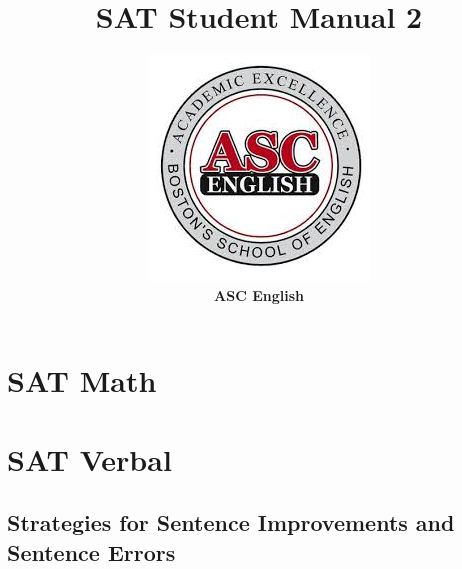 \documentclass[12pt]{book}
\title{\textbf{\sffamily\huge SAT Student Manual 2}}
\author{\includegraphics{logo}\\\textbf{\sffamily\large ASC English}}
\date{}
\begin{document}
\frontmatter
\maketitle


{\sffamily\tableofcontents}
\mainmatter



\part{SAT Math}



	
	
	
	
	
	
	


	
	
	
	
	


	
	
	
	
	
	


	
	
	
	


	
	
	
	


	
	


	
	
	
	

\part{SAT Verbal}

\chapter{Strategies for Sentence Improvements and Sentence Errors}
	
	
	
	
	
	
	
	
	
	
	
	
\end{document}
